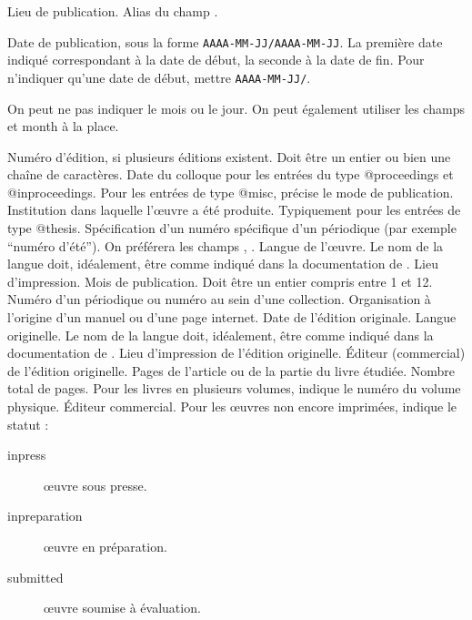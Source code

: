 \begin{fieldlist}
	
	Lieu de publication. Alias du champ .	
   	
	Date de publication, sous la forme \verb|AAAA-MM-JJ/AAAA-MM-JJ|.
	La première date indiqué correspondant à la date de début, la seconde à la date de fin. Pour n'indiquer qu'une date de début, mettre \verb|AAAA-MM-JJ/|. 
	
	On peut ne pas indiquer le mois ou le jour. On peut également utiliser les champs  et {month} à la place. 
	
	Numéro d'édition, si plusieurs éditions existent. Doit être un entier ou bien une chaîne de caractères.				
   	 Date du colloque pour les entrées du type @proceedings et @inproceedings. 
	 Pour les entrées de type @misc, précise le mode de publication.
   	 Institution dans laquelle l'œuvre a été produite. Typiquement pour les entrées de type @thesis. 
   	 Spécification d'un numéro spécifique d'un périodique (par exemple \enquote{numéro d'été}). On préférera les champs , .	
   	 Langue de l'œuvre. Le nom de la langue doit, idéalement, être comme indiqué dans la documentation de .					
   	 Lieu d'impression.  					
   	 Mois de publication. Doit être un entier compris entre 1 et 12. 
   	 Numéro d'un périodique ou numéro au sein d'une collection. 	
   	 Organisation à l'origine d'un manuel ou d'une page internet.	
   	 Date de l'édition originale.						
   	 Langue originelle. Le nom de la langue doit, idéalement, être comme indiqué dans la documentation de . 
   	 Lieu d'impression de l'édition originelle.		
   	 Éditeur (commercial) de l'édition originelle.		
	 Pages de l'article ou de la partie du livre étudiée. 
	 Nombre total de pages.
   	 Pour les livres en plusieurs volumes, indique le numéro du volume physique. 
   	 Éditeur commercial.					
   	 Pour les œuvres non encore imprimées, indique le statut :
					\begin{description}
						\item[inpress]œuvre sous presse.
						\item[inpreparation]œuvre en préparation.
						\item[submitted]œuvre soumise à évaluation.
					\end{description}
					

\end{fieldlist}
